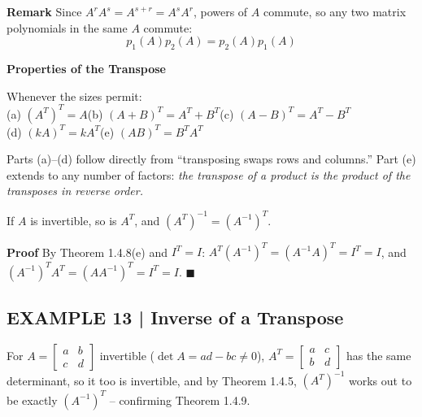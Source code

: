 \documentclass{article}
\newcommand{\redheading}[1]{{\vspace{2mm}\noindent\Large\bfseries\color{red!55!black} #1\par}\vspace{2mm}}
\theoremstyle{mystyle}
\begin{document}
\textbf{Remark} Since $A^rA^s=A^{s+r}=A^sA^r$, powers of $A$ commute, so any two matrix polynomials in the same $A$ commute:
\[
p_1(A)p_2(A)=p_2(A)p_1(A) \tag{4}
\]

\redheading{Properties of the Transpose}

\begin{tcolorbox}[colback=red!4, colframe=red!60!black, title=Theorem 1.4.8, boxrule=0.5mm, arc=3mm]
Whenever the sizes permit:\\
(a) $(A^T)^T=A$\quad (b) $(A+B)^T=A^T+B^T$\quad (c) $(A-B)^T=A^T-B^T$\\
(d) $(kA)^T=kA^T$\quad (e) $(AB)^T=B^TA^T$
\end{tcolorbox}
Parts (a)--(d) follow directly from ``transposing swaps rows and columns.'' Part (e) extends to any number of factors: \textit{the transpose of a product is the product of the transposes in reverse order.}

\begin{tcolorbox}[colback=red!4, colframe=red!60!black, title=Theorem 1.4.9, boxrule=0.5mm, arc=3mm]
If $A$ is invertible, so is $A^T$, and $(A^T)^{-1}=(A^{-1})^T$.
\end{tcolorbox}
\textbf{Proof} By Theorem 1.4.8(e) and $I^T=I$: $A^T(A^{-1})^T=(A^{-1}A)^T=I^T=I$, and $(A^{-1})^TA^T=(AA^{-1})^T=I^T=I$. $\blacksquare$

\subsection*{EXAMPLE 13 | Inverse of a Transpose}
For $A=\begin{bmatrix}a&b\\c&d\end{bmatrix}$ invertible ($\det A=ad-bc\ne0$), $A^T=\begin{bmatrix}a&c\\b&d\end{bmatrix}$ has the same determinant, so it too is invertible, and by Theorem 1.4.5, $(A^T)^{-1}$ works out to be exactly $(A^{-1})^T$ -- confirming Theorem 1.4.9.
\end{document}
